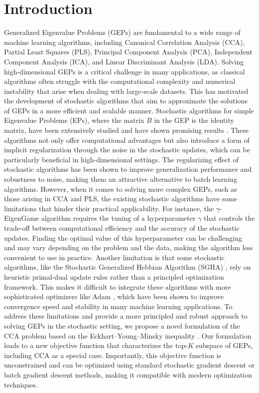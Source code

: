 \section{Introduction}
Generalized Eigenvalue Problems (GEPs) are fundamental to a wide range of machine learning algorithms, including Canonical Correlation Analysis (CCA), Partial Least Squares (PLS), Principal Component Analysis (PCA), Independent Component Analysis (ICA), and Linear Discriminant Analysis (LDA). Solving high-dimensional GEPs is a critical challenge in many applications, as classical algorithms often struggle with the computational complexity and numerical instability that arise when dealing with large-scale datasets. This has motivated the development of stochastic algorithms that aim to approximate the solutions of GEPs in a more efficient and scalable manner.
Stochastic algorithms for simple Eigenvalue Problems (EPs), where the matrix $B$ in the GEP is the identity matrix, have been extensively studied and have shown promising results \citep{arora2012stochastic,arora2016stochastic}. These algorithms not only offer computational advantages but also introduce a form of implicit regularization through the noise in the stochastic updates, which can be particularly beneficial in high-dimensional settings. The regularizing effect of stochastic algorithms has been shown to improve generalization performance and robustness to noise, making them an attractive alternative to batch learning algorithms.
However, when it comes to solving more complex GEPs, such as those arising in CCA and PLS, the existing stochastic algorithms have some limitations that hinder their practical applicability. For instance, the $\gamma$-EigenGame algorithm \citep{gemp20,gemp2021} requires the tuning of a hyperparameter $\gamma$ that controls the trade-off between computational efficiency and the accuracy of the stochastic updates. Finding the optimal value of this hyperparameter can be challenging and may vary depending on the problem and the data, making the algorithm less convenient to use in practice.
Another limitation is that some stochastic algorithms, like the Stochastic Generalized Hebbian Algorithm (SGHA) \citep{chen2019constrained}, rely on heuristic primal-dual update rules rather than a principled optimization framework. This makes it difficult to integrate these algorithms with more sophisticated optimizers like Adam \citep{kingma2014adam}, which have been shown to improve convergence speed and stability in many machine learning applications.
To address these limitations and provide a more principled and robust approach to solving GEPs in the stochastic setting, we propose a novel formulation of the CCA problem based on the Eckhart--Young--Minsky inequality \citep{stewart_matrix_1990}. Our formulation leads to a new objective function that characterizes the top-$K$ subspace of GEPs, including CCA as a special case. Importantly, this objective function is unconstrained and can be optimized using standard stochastic gradient descent or batch gradient descent methods, making it compatible with modern optimization techniques.
